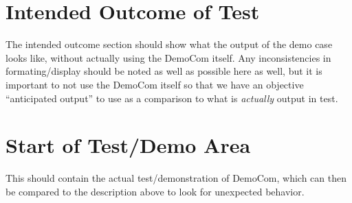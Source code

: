 \documentclass{ximera}
\begin{document}
\section{Intended Outcome of Test}

The intended outcome section should show what the output of the demo case looks like, without actually using the DemoCom itself.
Any inconsistencies in formating/display should be noted as well as possible here as well, but it is important to not use the 
DemoCom itself so that we have an objective ``anticipated output'' to use as a comparison to what is \textit{actually} output in
test. 

\section{Start of Test/Demo Area}

This should contain the actual test/demonstration of DemoCom, which can then be compared to the description above to look for 
unexpected behavior.

\hrulefill
\end{document}
